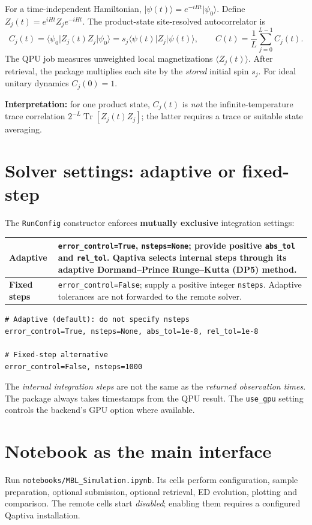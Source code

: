 \documentclass[10pt,a4paper]{article}
\newcommand{\ket}[1]{\lvert #1 \rangle}
\newcommand{\bra}[1]{\langle #1 \rvert}
\begin{document}
For a time-independent Hamiltonian, $\ket{\psi(t)}=e^{-iHt}\ket{\psi_0}$. Define $Z_j(t)=e^{iHt}Z_je^{-iHt}$. The product-state site-resolved autocorrelator is
\begin{equation}
\boxed{C_j(t)=\bra{\psi_0}Z_j(t)Z_j\ket{\psi_0}
=s_j\bra{\psi(t)}Z_j\ket{\psi(t)},}
\qquad
\boxed{C(t)=\frac1L\sum_{j=0}^{L-1}C_j(t).}
\end{equation}
The QPU job measures unweighted local magnetizations $\langle Z_j(t)\rangle$. After retrieval, the package multiplies each site by the \emph{stored} initial spin $s_j$. For ideal unitary dynamics $C_j(0)=1$.

\textbf{Interpretation:} for one product state, $C_j(t)$ is \emph{not} the infinite-temperature trace correlation $2^{-L}\operatorname{Tr}[Z_j(t)Z_j]$; the latter requires a trace or suitable state averaging.

\section{Solver settings: adaptive or fixed-step}
The \texttt{RunConfig} constructor enforces \textbf{mutually exclusive} integration settings:

\begin{tabularx}{\textwidth}{@{}p{30mm}X@{}}
\toprule
\textbf{Adaptive} & \texttt{error\_control=True}, \texttt{nsteps=None}; provide positive \texttt{abs\_tol} and \texttt{rel\_tol}. Qaptiva selects internal steps through its adaptive Dormand--Prince Runge--Kutta (DP5) method. \\
\midrule
\textbf{Fixed steps} & \texttt{error\_control=False}; supply a positive integer \texttt{nsteps}. Adaptive tolerances are not forwarded to the remote solver. \\
\bottomrule
\end{tabularx}

\begin{lstlisting}
# Adaptive (default): do not specify nsteps
error_control=True, nsteps=None, abs_tol=1e-8, rel_tol=1e-8

# Fixed-step alternative
error_control=False, nsteps=1000
\end{lstlisting}

The \emph{internal integration steps} are not the same as the \emph{returned observation times}. The package always takes timestamps from the QPU result. The \texttt{use\_gpu} setting controls the backend's GPU option where available.

\section{Notebook as the main interface}
Run \texttt{notebooks/MBL\_Simulation.ipynb}. Its cells perform configuration, sample preparation, optional submission, optional retrieval, ED evolution, plotting and comparison. The remote cells start \emph{disabled}; enabling them requires a configured Qaptiva installation.
\end{document}
